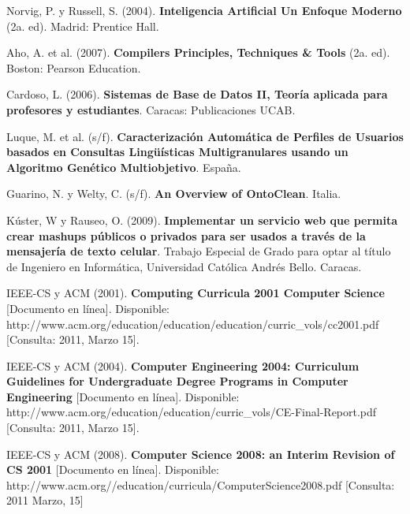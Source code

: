 \begin{thebibliography}{20}
     Norvig, P. y Russell, S. (2004). \textbf{Inteligencia Artificial Un Enfoque Moderno} (2a. ed). Madrid: Prentice Hall.

     Aho, A. et al. (2007). \textbf{Compilers Principles, Techniques & Tools} (2a. ed). Boston: Pearson Education.

     Cardoso, L. (2006). \textbf{Sistemas de Base de Datos II, Teoría aplicada para profesores y estudiantes}. Caracas: Publicaciones UCAB.

     Luque, M. et al. (s/f). \textbf{Caracterización Automática de Perfiles de Usuarios basados en Consultas Lingüísticas Multigranulares usando un Algoritmo Genético Multiobjetivo}. España.

 Guarino, N. y Welty, C. (s/f). \textbf{An Overview of OntoClean}. Italia.

 Kúster, W y Rauseo, O. (2009). \textbf{Implementar un servicio web que permita crear mashups públicos o privados para ser usados a través de la mensajería de texto celular}. Trabajo Especial de Grado para optar al título de Ingeniero en Informática, Universidad Católica Andrés Bello. Caracas.

 IEEE-CS y ACM (2001). \textbf{Computing Curricula 2001 Computer Science} [Documento en línea]. Disponible: http://www.acm.org/education/education/education/curric\_vols/cc2001.pdf [Consulta: 2011, Marzo 15].

 IEEE-CS y ACM (2004). \textbf{Computer Engineering 2004: Curriculum Guidelines for Undergraduate Degree Programs in Computer Engineering} [Documento en línea]. Disponible: http://www.acm.org/education/education/curric\_vols/CE-Final-Report.pdf [Consulta: 2011, Marzo 15].

 IEEE-CS y ACM (2008). \textbf{Computer Science 2008: an Interim Revision of CS 2001} [Documento en línea]. Disponible: http://www.acm.org//education/curricula/ComputerScience2008.pdf [Consulta: 2011 Marzo, 15]

\end{thebibliography}
